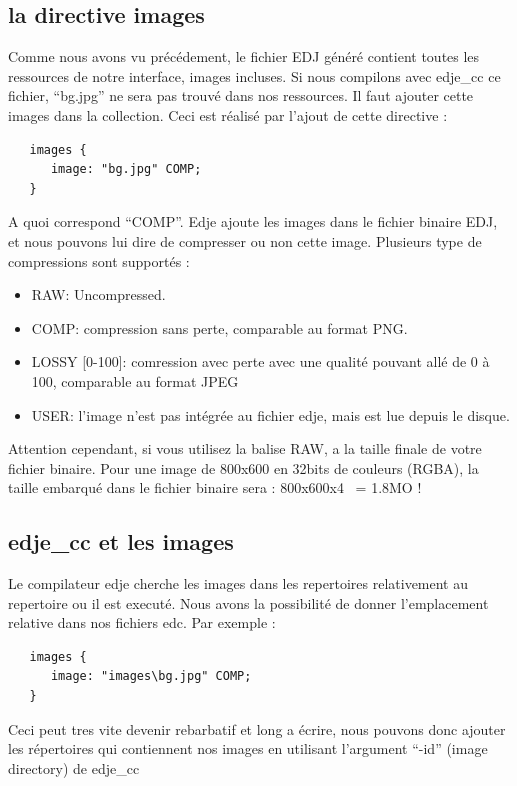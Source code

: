 \documentclass[a4paper]{efr}
\begin{document}
\subsection{la directive images}
Comme nous avons vu précédement, le fichier EDJ généré contient toutes les
ressources de notre interface, images incluses. Si nous compilons avec edje\_cc
ce fichier, ``bg.jpg'' ne sera pas trouvé dans nos ressources. Il faut ajouter
cette images dans la collection. Ceci est réalisé par l'ajout de cette directive
:
\begin{lstlisting}
   images {
      image: "bg.jpg" COMP;
   }
\end{lstlisting}

A quoi correspond ``COMP''. Edje ajoute les images dans le fichier binaire EDJ,
et nous pouvons lui dire de compresser ou non cette image.
Plusieurs type de compressions sont supportés :
\begin{itemize}
\item RAW: Uncompressed.
\item COMP: compression sans perte, comparable au format PNG.
\item LOSSY [0-100]: comression avec perte avec une qualité pouvant allé
de 0 à 100, comparable au format JPEG
\item USER: l'image n'est pas intégrée au fichier edje, mais est lue depuis
le disque.
\end{itemize}

Attention cependant, si vous utilisez la balise RAW, a la taille
finale de votre fichier binaire.
Pour une image de 800x600 en 32bits de couleurs (RGBA), la taille embarqué dans
le fichier binaire sera : 800x600x4 ~= 1.8MO !

\subsection{edje\_cc et les images}
Le compilateur edje cherche les images dans les repertoires relativement au
repertoire ou il est executé.
Nous avons la possibilité de donner l'emplacement relative dans nos fichiers
edc. Par exemple :

\begin{lstlisting}
   images {
      image: "images\bg.jpg" COMP;
   }
\end{lstlisting}

Ceci peut tres vite devenir rebarbatif et long a écrire, nous pouvons donc
ajouter les répertoires qui contiennent nos images en utilisant l'argument
``-id'' (image directory) de edje\_cc
\end{document}
